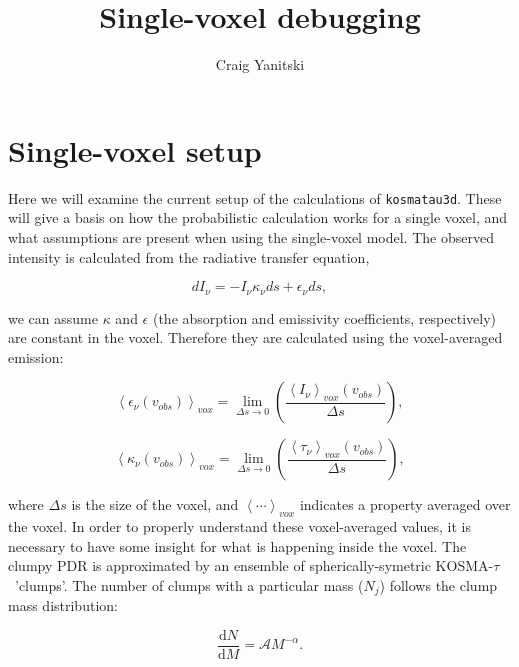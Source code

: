 \documentclass[a4paper]{article}
\newcommand{\kosmatau}{KOSMA-\(\tau\)}
\begin{document}
    \title{Single-voxel debugging}
    \author{Craig Yanitski}
    \maketitle

    \section{Single-voxel setup}
    \label{setup}

    Here we will examine the current setup of the calculations of \texttt{kosmatau3d}.
    These will give a basis on how the probabilistic calculation works for a single voxel, and what assumptions are present when using the single-voxel model.
    The observed intensity is calculated from the radiative transfer equation,

    \begin{equation}
    \label{radiative transfer equation}
    dI_\nu = - I_\nu \kappa_\nu ds + \epsilon_\nu ds,
    \end{equation}

    we can assume \(\kappa\) and \(\epsilon\) (the absorption and emissivity coefficients, respectively) are constant in the voxel.
    Therefore they are calculated using the voxel-averaged emission:

    \begin{equation}
    \label{voxel-averaged emissivity}
    \left<\epsilon_\nu (v_{obs})\right>_{vox} = \lim_{\Delta s \to 0} \left( \frac{\left<I_\nu\right>_{vox} (v_{obs})}{\Delta s} \right),
    \end{equation}

    \begin{equation}
    \label{voxel-averaged opacity}
    \left<\kappa_\nu (v_{obs})\right>_{vox} = \lim_{\Delta s \to 0} \left( \frac{\left<\tau_\nu\right>_{vox} (v_{obs})}{\Delta s} \right),
    \end{equation}

    where \(\Delta s\) is the size of the voxel, and \(\left< \cdots \right>_{vox}\) indicates a property averaged over the voxel.
    In order to properly understand these voxel-averaged values, it is necessary to have some insight for what is happening inside the voxel.
    The clumpy PDR is approximated by an ensemble of spherically-symetric \kosmatau \ 'clumps'.
    The number of clumps with a particular mass (\(N_j\)) follows the clump mass distribution:

    \begin{equation}
    \label{mass function}
    \frac{\mathrm{d}N}{\mathrm{d}M} = \mathcal{A} M^{-\alpha}.
    \end{equation}
\end{document}
